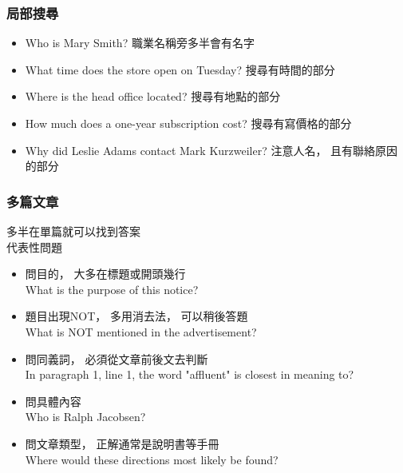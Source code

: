 \documentclass{beamer}
\begin{document}
{\begin{CJK*}{UTF8}{bkai}
\begin{frame}
\frametitle{局部搜尋}
\begin{itemize}
\item Who is Mary Smith? 職業名稱旁多半會有名字
\item What time does the store open on Tuesday? 搜尋有時間的部分
\item Where is the head office located? 搜尋有地點的部分
\item How much does a one-year subscription cost? 搜尋有寫價格的部分
\item Why did Leslie Adams contact Mark Kurzweiler? 注意人名， 且有聯絡原因的部分
\end{itemize}
\end{frame}


\begin{frame}
\frametitle{多篇文章}
多半在單篇就可以找到答案\\
代表性問題
\begin{itemize}
\item 問目的， 大多在標題或開頭幾行\\
What is the purpose of this notice?
\item 題目出現NOT， 多用消去法， 可以稍後答題 \\
What is NOT mentioned in the advertisement?
\item 問同義詞， 必須從文章前後文去判斷\\
In paragraph 1, line 1, the word "affluent" is closest in meaning to?
\item 問具體內容\\
Who is Ralph Jacobsen?

\item 問文章類型， 正解通常是說明書等手冊\\
Where would these directions most likely be found?
\end{itemize}
\end{frame}
\end{CJK*}
}
\end{document}
